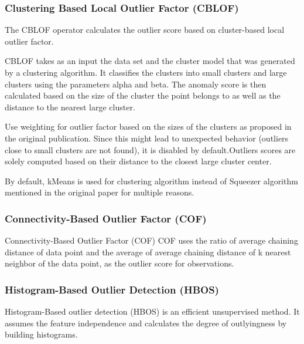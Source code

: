 \subsubsection{Clustering Based Local Outlier Factor (CBLOF)}
The CBLOF operator calculates the outlier score based on cluster-based local outlier factor.

CBLOF takes as an input the data set and the cluster model that was generated by a clustering algorithm.
It classifies the clusters into small clusters and large clusters using the parameters alpha and beta.
The anomaly score is then calculated based on the size of the cluster the point belongs to as well as the distance to the nearest large cluster.

Use weighting for outlier factor based on the sizes of the clusters as proposed in the original publication.
Since this might lead to unexpected behavior (outliers close to small clusters are not found), it is disabled by default.Outliers scores are solely computed based on their distance to the closest large cluster center.

By default, kMeans is used for clustering algorithm instead of Squeezer algorithm mentioned in the original paper for multiple reasons.
\cite{he2003cblof}

\subsubsection{Connectivity-Based Outlier Factor (COF)}
Connectivity-Based Outlier Factor (COF) COF uses the ratio of average chaining distance of data point and the average of average chaining distance of k nearest neighbor of the data point, as the outlier score for observations.
\cite{tang2002cof}

\subsubsection{Histogram-Based Outlier Detection (HBOS)}
Histogram-Based outlier detection (HBOS) is an efficient unsupervised method.
It assumes the feature independence and calculates the degree of outlyingness by building histograms.
\cite{goldstein2012hbos}


